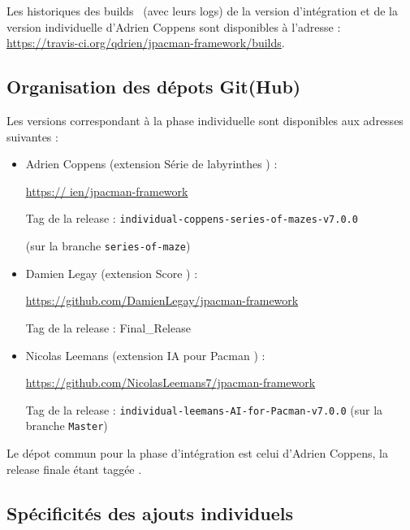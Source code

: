 \documentclass[12pt, openany]{report}
\begin{document}
Les historiques des \og builds \fg \, (avec leurs logs) de la version d'intégration et de la version individuelle d'Adrien Coppens sont disponibles à l'adresse : \url{https://travis-ci.org/qdrien/jpacman-framework/builds}.

\subsection{Organisation des dépots Git(Hub)}
Les versions correspondant à la phase individuelle sont disponibles aux adresses suivantes :
\begin{itemize}
	\item Adrien Coppens (extension \og Série de labyrinthes \fg ) : 
	
	\url{https://
              ien/jpacman-framework}
	
	Tag de la release : \nolinkurl{individual-coppens-series-of-mazes-v7.0.0}
	
	(sur la branche \nolinkurl{series-of-maze})
	\item Damien Legay (extension \og Score \fg ) : 
	
	\url{https://github.com/DamienLegay/jpacman-framework}
	
	Tag de la release : \nolinkurl{}{Final\_Release}
	\item Nicolas Leemans (extension \og IA pour Pacman \fg ) : 
	
	\url{https://github.com/NicolasLeemans7/jpacman-framework}
	
	Tag de la release : \nolinkurl{individual-leemans-AI-for-Pacman-v7.0.0}
	(sur la branche \nolinkurl{Master})
\end{itemize}

Le dépot commun pour la phase d'intégration est celui d'Adrien Coppens, la release finale étant taggée \nolinkurl{}. %



\subsection{Spécificités des ajouts individuels}
\end{document}
